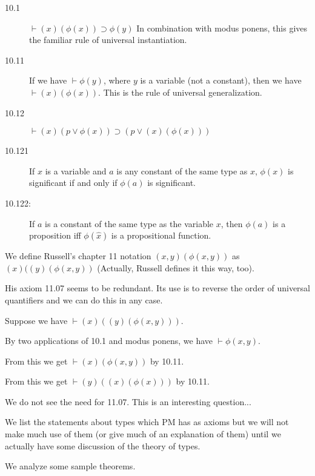 \documentclass[12pt]{article}
\begin{document}
\begin{description}

\item[10.1]  $\vdash (x)(\phi(x)) \supset \phi(y)$  In combination with modus ponens, this gives the familiar rule of universal instantiation.

\item[10.11] If we have $\vdash \phi(y)$, where $y$ is a variable (not a constant), then we have $\vdash (x)(\phi(x))$.  This is the rule of universal generalization.

\item[10.12]  $\vdash (x)(p \vee \phi(x)) \supset (p \vee (x)(\phi(x)))$

\item[10.121]  If $x$ is a variable and $a$ is any constant of the same type as $x$, $\phi(x)$ is significant if and only if $\phi(a)$ is significant.

\item[10.122:]  If $a$ is a constant of the same type as the variable $x$, then $\phi(a)$ is a proposition iff $\phi(\hat{x})$ is a propositional function.



\end{description}

We define Russell's chapter 11 notation $(x,y)(\phi(x,y))$ as $(x)((y)(\phi(x,y))$ (Actually, Russell defines it this way, too).

His axiom 11.07 seems to be redundant.  Its use is to reverse the order of universal quantifiers and we can do this in any case.

Suppose we have $\vdash (x)((y)(\phi(x,y)))$.

By two applications of 10.1 and modus ponens, we have $\vdash \phi(x,y)$.

From this we get $\vdash (x)(\phi(x,y))$ by 10.11.

From this we get $\vdash (y)((x)(\phi(x)))$ by 10.11.

We do not see the need for 11.07.  This is an interesting question...

We list the statements about types which PM has as axioms but we will not make much use of them (or give much of an explanation of them) until we actually have some discussion of the theory of types.

We analyze some sample theorems.
\end{document}
